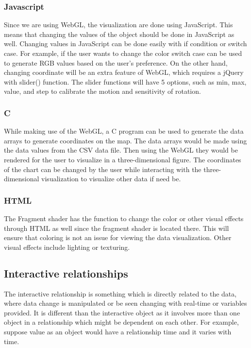 \documentclass[journal,10pt,onecolumn,compsoc]{IEEEtran} \usepackage[margin=1.0in]{geometry} \usepackage{pdfpages}
\begin{document}
        \subsubsection{Javascript}
         Since we are using WebGL, the visualization are done using JavaScript. This means that changing the values of the object should be done in JavaScript as well. Changing values in JavaScript can be done easily with if condition or switch case. For example, if the user wants to change the color switch case can be used to generate RGB values based on the user's preference. On the other hand, changing coordinate will be an extra feature of WebGL, which requires a jQuery with slider() function. The slider functions will have 5 options, such as min, max, value, and step to calibrate the motion and sensitivity of rotation.

        \subsubsection{C}
        While making use of the WebGL, a C program can be used to generate the data arrays to generate coordinates on the map. The data arrays would be made using the data values from the CSV data file. Then using the WebGL they would be rendered for the user to visualize in a three-dimensional figure. The coordinates of the chart can be changed by the user while interacting with the three-dimensional visualization to visualize other data if need be. 

        \subsubsection{HTML}
        The Fragment shader has the function to change the color or other visual effects through HTML as well since the fragment shader is located there. This will ensure that coloring is not an issue for viewing the data visualization. Other visual effects include lighting or texturing. 
        
        
    \subsection{Interactive relationships}
    The interactive relationship is something which is directly related to the data, where data change is manipulated or be seen changing with real-time or variables provided. It is different than the interactive object as it involves more than one object in a relationship which might be dependent on each other. For example, suppose value as an object would have a relationship time and it varies with time.
\end{document}
